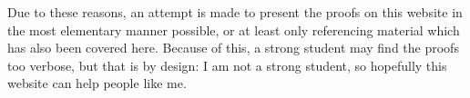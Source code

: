 \documentclass{scrartcl}
\begin{document}
Due to these reasons, an attempt is made to present the proofs on this website in the most elementary manner possible,
or at least only referencing material which has also been covered here.
Because of this, a strong student may find the proofs too verbose, but that is by design: I am not a strong student, so
hopefully this website can help people like me.
\end{document}
